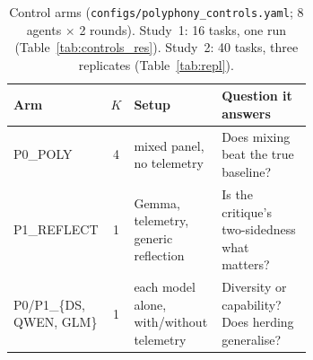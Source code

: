 \documentclass[10pt]{article}
\newenvironment{fittable}{\begin{lrbox}{\manuscripttable}}{%
\end{lrbox}\ifdim\wd\manuscripttable>\linewidth
\resizebox{\linewidth}{!}{\usebox{\manuscripttable}}%
\else\usebox{\manuscripttable}\fi}
\theoremstyle{manuscript}\newtheorem{proposition}{Proposition}
\begin{document}
\begin{table}[ht]\centering\small
\caption{Control arms (\texttt{configs/polyphony\_controls.yaml}; 8 agents $\times$ 2 rounds). Study~1: 16 tasks, one run (Table~\ref{tab:controls_res}). Study~2: 40 tasks, three replicates (Table~\ref{tab:repl}).}\label{tab:controls}
\begin{fittable}
\begin{tabular}{@{}lc>{\raggedright\arraybackslash}p{0.3\linewidth}>{\raggedright\arraybackslash}p{0.36\linewidth}@{}}\toprule
Arm & $K$ & Setup & Question it answers\\\midrule
P0\_POLY & 4 & mixed panel, no telemetry & Does mixing beat the true baseline?\\
P1\_REFLECT & 1 & Gemma, telemetry, generic reflection & Is the critique's two-sidedness what matters?\\
P0/P1\_\{DS, QWEN, GLM\} & 1 & each model alone, with/without telemetry & Diversity or capability? Does herding generalise?\\\bottomrule
\end{tabular}
\end{fittable}
\end{table}
\end{document}
